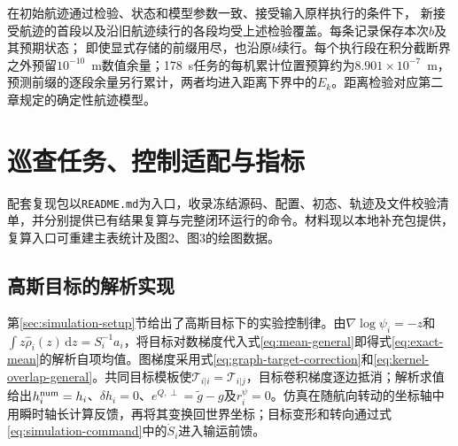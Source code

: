 \documentclass[UTF8,a4paper,11pt,fontset=none]{ctexart}
\begin{document}
在初始航迹通过检验、状态和模型参数一致、接受输入原样执行的条件下，
新接受航迹的首段以及沿旧航迹续行的各段均受上述检验覆盖。每条记录保存本次$b$及其预期状态；
即使显式存储的前缀用尽，也沿原$b$续行。每个执行段在积分截断界之外预留$10^{-10}$~m数值余量；178~s任务的每机累计位置预算约为$8.901\times10^{-7}$~m，预测前缀的逐段余量另行累计，两者均进入距离下界中的$E_k$。距离检验对应第二章规定的确定性航迹模型。

\section{巡查任务、控制适配与指标}\label{app:external}
配套复现包以\texttt{README.md}为入口，收录冻结源码、配置、初态、轨迹及文件校验清单，并分别提供已有结果复算与完整闭环运行的命令。材料现以本地补充包提供，复算入口可重建主表统计及图2、图3的绘图数据。
\subsection{高斯目标的解析实现}\label{app:gaussian-implementation}
第\ref{sec:simulation-setup}节给出了高斯目标下的实验控制律。由$\nabla\log\psi_i=-z$和$\int z\widehat\rho_i(z)\,\mathrm dz=S_i^{-1}a_i$，将目标对数梯度代入式\eqref{eq:mean-general}即得式\eqref{eq:exact-mean}的解析自项均值。图梯度采用式\eqref{eq:graph-target-correction}和\eqref{eq:kernel-overlap-general}。共同目标模板使$\mathcal T_{i|i}=\mathcal T_{i|j}$，目标卷积梯度逐边抵消；解析求值给出$h_i^{\rm num}=h_i$、$\delta h_i=0$、$e^{Q,\perp}=\widetilde g-g$及$r_i^\psi=0$。仿真在随航向转动的坐标轴中用瞬时轴长计算反馈，再将其变换回世界坐标；目标变形和转向通过式\eqref{eq:simulation-command}中的$\dot S_i$进入输运前馈。
\end{document}
